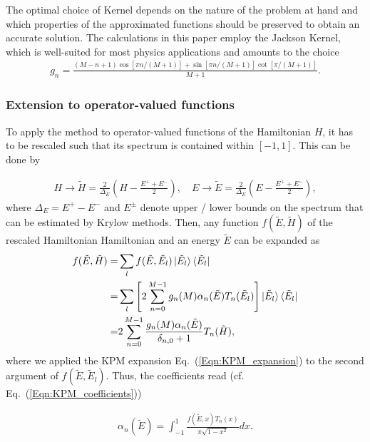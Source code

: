 \documentclass[aps,prb,amsmath,amssymb,twocolumn, superscriptaddress]{revtex4-2}
\newcommand{\eq}[1]{Eq.~(\ref{#1})}
\begin{document}
The optimal choice of Kernel depends on the nature of the problem at hand and which properties of the approximated functions should be preserved to obtain an accurate solution. The calculations in this paper employ the Jackson Kernel, which is well-suited for most physics applications and amounts to the choice
\begin{align}
g_n = \frac{(M-n+1) \cos[\pi n / (M+1)] + \sin[\pi n / (M+1)] \cot[\pi / (M+1)]}{M+1}.
\end{align} 

\subsubsection{Extension to operator-valued functions}
To apply the method to operator-valued functions of the Hamiltonian $H$, it has to be rescaled such that its spectrum is contained within $[-1,1]$. This can be done by

\begin{align}
H \to \tilde H = \frac{2}{\Delta_E}\left(H - \frac{E^+ + E^-}{2} \right), \quad E \to \tilde E = \frac{2}{\Delta_E}\left(E - \frac{E^+ + E^-}{2} \right), \label{Eqn:rescaling_KPM}
\end{align}
where $\Delta_E = E^+ - E^-$ and $E^\pm$ denote upper / lower bounds on the spectrum that can be estimated by Krylow methods. Then, any function $f(\tilde E, \tilde H)$ of the rescaled Hamiltonian Hamiltonian and an energy $\tilde E$ can be expanded as
\begin{align}
f(\tilde  E,\tilde  H) =& \sum_l f(\tilde  E, \tilde  E_l) \ket{\tilde  E_l}\bra{\tilde  E_l} \nonumber \\
=& \sum_l \left[2 \sum_{n = 0}^{M-1}g_n(M) \alpha_n(\tilde E) T_n(\tilde E_l) \right ]\ket{\tilde E_l}\bra{\tilde E_l} \nonumber  \\
=& 2 \sum_{n = 0}^{M-1}\frac{g_n(M) \alpha_n(\tilde E) }{\delta_{n,0} + 1} T_n(\tilde H), \label{Eqn:KPM_expansion_operator}
\end{align} 
where we applied the KPM expansion \eq{Eqn:KPM_expansion} to the second argument of $f(\tilde E,\tilde E_l)$. Thus, the coefficients read (cf. \eq{Eqn:KPM_coefficients})

\begin{align}
\alpha_n(\tilde E) = \int_{-1}^{1} \frac{f(\tilde E, x) T_n(x)}{\pi \sqrt{1 -x^2}} dx. \label{Eqn:KPM_coefficients_operator}
\end{align} 
\end{document}
